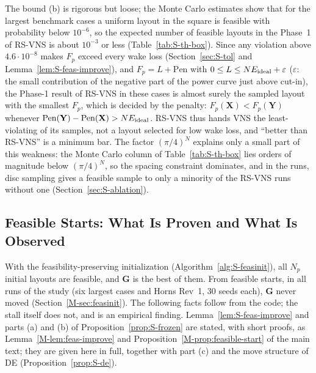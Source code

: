 The bound (b) is rigorous but loose; the Monte Carlo estimates show that for the largest benchmark cases a uniform layout in the square is feasible with probability below $10^{-6}$, so the expected number of feasible layouts in the Phase~1 of RS-VNS is about $10^{-3}$ or less (Table~\ref{tab:S-th-box}). Since any violation above $4.6\cdot10^{-8}$ makes $F_p$ exceed every wake loss (Section~\ref{sec:S-tol} and Lemma~\ref{lem:S-feas-improve}), and $F_p=L+\mathrm{Pen}$ with $0\le L\le NE_{\rm ideal}+\varepsilon$ ($\varepsilon$: the small contribution of the negative part of the power curve just above cut-in), the Phase-1 result of RS-VNS in these cases is almost surely the sampled layout with the smallest $F_p$, which is decided by the penalty: $F_p(\mathbf X)<F_p(\mathbf Y)$ whenever $\mathrm{Pen}(\mathbf Y)-\mathrm{Pen}(\mathbf X)>NE_{\rm ideal}$. RS-VNS thus hands VNS the least-violating of its samples, not a layout selected for low wake loss, and ``better than RS-VNS'' is a minimum bar. The factor $(\pi/4)^N$ explains only a small part of this weakness: the Monte Carlo column of Table~\ref{tab:S-th-box} lies orders of magnitude below $(\pi/4)^N$, so the spacing constraint dominates, and in the runs, disc sampling gives a feasible sample to only a minority of the RS-VNS runs without one (Section~\ref{sec:S-ablation}).

\subsection{Feasible Starts: What Is Proven and What Is Observed}
\label{sec:S-th-feas}
With the feasibility-preserving initialization (Algorithm~\ref{alg:S-feasinit}), all $N_p$ initial layouts are feasible, and $\mathbf G$ is the best of them. From feasible starts, in all runs of the study (six largest cases and Horns Rev~1, 30 seeds each), $\mathbf G$ never moved (Section~\ref{M-sec:feasinit}). The following facts follow from the code; the stall itself does not, and is an empirical finding. Lemma~\ref{lem:S-feas-improve} and parts (a) and (b) of Proposition~\ref{prop:S-frozen} are stated, with short proofs, as Lemma~\ref{M-lem:feas-improve} and Proposition~\ref{M-prop:feasible-start} of the main text; they are given here in full, together with part (c) and the move structure of DE (Proposition~\ref{prop:S-de}).

